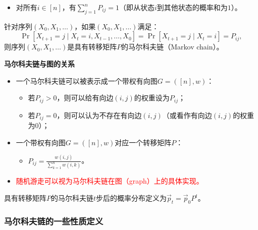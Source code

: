 \documentclass[lang=cn,newtx,10pt,scheme=chinese,chinesefont=nofont,citestyle=gb7714-2015, bibstyle=gb7714-2015]{elegantbook}
\begin{document}
\begin{refsection}
\begin{definition}[转移矩阵]
\begin{itemize}
        \item 对所有$i\in[n]$，有$\sum_{j=1}^n{P_{ij}}=1$（即从状态$i$到其他状态的概率和为$1$）。
    \end{itemize}
\end{definition}

\begin{definition}[马尔科夫链]
    \label{defn:markov-chains}
    针对序列$(X_0,X_1,\dots)$，如果$(X_0,X_1,\dots)$满足：
    \[
        \Pr[X_{t+1}=j\mid X_t=i,X_{t-1},\dots,X_0]=\Pr[X_{t+1}=j\mid X_t=i]=P_{ij},
    \]
    则序列$(X_0,X_1,\dots)$是具有转移矩阵$P$的马尔科夫链（Markov chain）。
\end{definition}

\textbf{马尔科夫链与图的关系}

\begin{itemize}
    \item 一个马尔科夫链可以被表示成一个带权有向图$G=([n],w)$：
        \begin{itemize}
            \item 若$P_{ij}>0$，则可以给有向边$(i,j)$的权重设为$P_{ij}$；
            \item 若$P_{ij}=0$，则可以认为不存在有向边$(i,j)$（或看作有向边$(i,j)$的权重为$0$）；
        \end{itemize}
    \item 一个带权有向图$G=([n],w)$对应一个转移矩阵$P$：
        \begin{itemize}
            \item $P_{ij}=\frac{w(i,j)}{\sum_{k=1}^n{w(i,k)}}$。
        \end{itemize}
    \item \textcolor{red}{随机游走可以视为马尔科夫链在图（graph）上的具体实现。}
\end{itemize}

\begin{definition}[概率分布]
    \label{defn:probability-distribution}
    具有转移矩阵$P$的马尔科夫链$t$步后的概率分布定义为$\vec{p}_t = \vec{p}_0 P^t$。
\end{definition}



    \subsubsection{马尔科夫链的一些性质定义}
        

\end{refsection}
\end{document}
